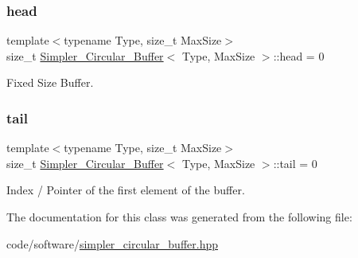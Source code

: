 \subsubsection{\texorpdfstring{head}{head}}
{\footnotesize\ttfamily template$<$typename Type, size\+\_\+t Max\+Size$>$ \\
size\+\_\+t \hyperlink{classSimpler__Circular__Buffer}{Simpler\+\_\+\+Circular\+\_\+\+Buffer}$<$ Type, Max\+Size $>$\+::head = 0\hspace{0.3cm}{\ttfamily [private]}}



Fixed Size Buffer. 

\mbox{\label{classSimpler__Circular__Buffer_a2833e67d4d6cfae68e71306037015642}} 
\subsubsection{\texorpdfstring{tail}{tail}}
{\footnotesize\ttfamily template$<$typename Type, size\+\_\+t Max\+Size$>$ \\
size\+\_\+t \hyperlink{classSimpler__Circular__Buffer}{Simpler\+\_\+\+Circular\+\_\+\+Buffer}$<$ Type, Max\+Size $>$\+::tail = 0\hspace{0.3cm}{\ttfamily [private]}}



Index / Pointer of the first element of the buffer. 



The documentation for this class was generated from the following file\+:\begin{DoxyCompactItemize}
\item 
code/software/\hyperlink{simpler__circular__buffer_8hpp}{simpler\+\_\+circular\+\_\+buffer.\+hpp}\end{DoxyCompactItemize}
